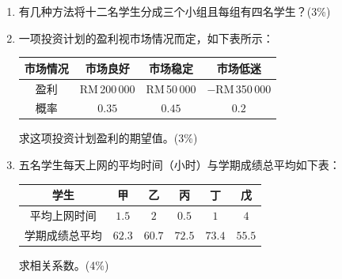 \documentclass[12pt,a4paper]{exam-zh}
\begin{document}
\begin{question}
    \begin{enumerate}[label=(\alph*)]
        \item 有几种方法将十二名学生分成三个小组且每组有四名学生？\hfill(3\%)
        \item 一项投资计划的盈利视市场情况而定，如下表所示：
        \begin{center}
        \begin{tabular}{|c|c|c|c|}
            \hline
            市场情况 & 市场良好 & 市场稳定 & 市场低迷 \\
            \hline
            盈利 & RM\,200\,000 & RM\,50\,000 & $-$RM\,350\,000 \\
            \hline
            概率 & $0.35$ & $0.45$ & $0.2$ \\
            \hline
        \end{tabular}
        \end{center}
        求这项投资计划盈利的期望值。\hfill(3\%)
        \item 五名学生每天上网的平均时间（小时）与学期成绩总平均如下表：
        \begin{center}
        \begin{tabular}{|c|c|c|c|c|c|}
            \hline
            学生 & 甲 & 乙 & 丙 & 丁 & 戊 \\
            \hline
            平均上网时间 & $1.5$ & $2$ & $0.5$ & $1$ & $4$ \\
            \hline
            学期成绩总平均 & $62.3$ & $60.7$ & $72.5$ & $73.4$ & $55.5$ \\
            \hline
        \end{tabular}
        \end{center}
        求相关系数。\hfill(4\%)
    \end{enumerate}
\end{question}
\end{document}
